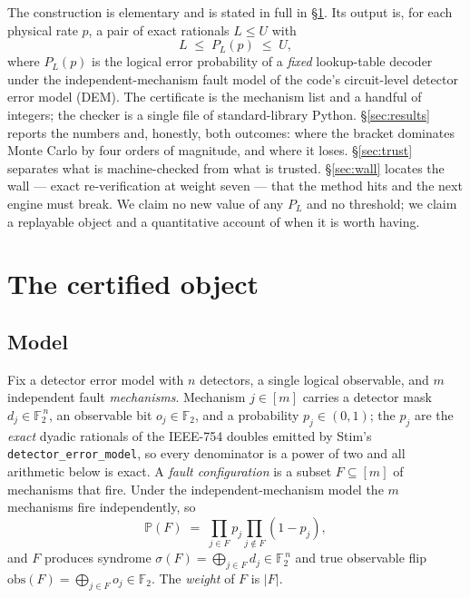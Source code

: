 \documentclass[11pt]{amsart}
\newcommand{\PL}{P_{L}}
\newcommand{\sig}{\sigma}
\newcommand{\obs}{\mathrm{obs}}
\newcommand{\Prb}{\mathbb{P}}
\newcommand{\Zt}{\mathbb{F}_2}
\theoremstyle{plain}
\theoremstyle{definition}
\theoremstyle{remark}
\begin{document}
The construction is elementary and is stated in full in \S\ref{sec:object}.
Its output is, for each physical rate $p$, a pair of exact rationals $L\le U$
with
\[
   L \;\le\; \PL(p) \;\le\; U ,
\]
where $\PL(p)$ is the logical error probability of a \emph{fixed} lookup-table
decoder under the independent-mechanism fault model of the code's
circuit-level detector error model (DEM). The certificate is the mechanism list
and a handful of integers; the checker is a single file of standard-library
Python. \S\ref{sec:results} reports the numbers and, honestly, both outcomes:
where the bracket dominates Monte Carlo by four orders of magnitude, and where
it loses. \S\ref{sec:trust} separates what is machine-checked from what is
trusted. \S\ref{sec:wall} locates the wall --- exact re-verification at weight
seven --- that the method hits and the next engine must break. We claim no new
value of any $\PL$ and no threshold; we claim a replayable object and a
quantitative account of when it is worth having.

\section{The certified object}\label{sec:object}

\subsection{Model}\label{ssec:model} Fix a detector error model with $n$
detectors, a single logical observable, and $m$ independent fault
\emph{mechanisms}. Mechanism $j\in[m]$ carries a detector mask
$d_j\in\Zt^{\,n}$, an observable bit $o_j\in\Zt$, and a probability
$p_j\in(0,1)$; the $p_j$ are the \emph{exact} dyadic rationals of the
IEEE-754 doubles emitted by Stim's \texttt{detector\_error\_model}, so every
denominator is a power of two and all arithmetic below is exact. A
\emph{fault configuration} is a subset $F\subseteq[m]$ of mechanisms that fire.
Under the independent-mechanism model the $m$ mechanisms fire independently, so
\begin{equation}\label{eq:PF}
   \Prb(F)\;=\;\prod_{j\in F}p_j\prod_{j\notin F}(1-p_j),
\end{equation}
and $F$ produces syndrome $\sig(F)=\bigoplus_{j\in F}d_j\in\Zt^{\,n}$ and true
observable flip $\obs(F)=\bigoplus_{j\in F}o_j\in\Zt$. The \emph{weight} of $F$
is $|F|$.
\end{document}
